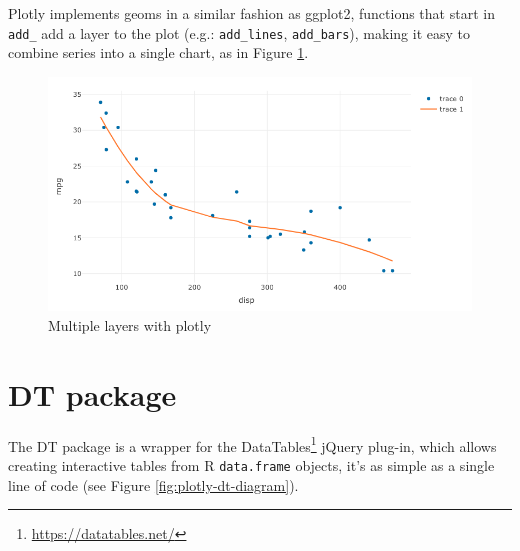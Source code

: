 \documentclass[10pt,]{krantz}
\makeatletter
\newenvironment{Shaded}{\begin{snugshade}}{\end{snugshade}}
\newcommand{\DataTypeTok}[1]{\textcolor[rgb]{0.27,0.27,0.27}{#1}}
\newcommand{\KeywordTok}[1]{\textcolor[rgb]{0.27,0.27,0.27}{\textbf{#1}}}
\newcommand{\NormalTok}[1]{#1}
\newcommand{\OperatorTok}[1]{\textcolor[rgb]{0.43,0.43,0.43}{\textbf{#1}}}
\newcommand{\StringTok}[1]{\textcolor[rgb]{0.5,0.5,0.5}{#1}}
\renewcommand{\href}[2]{#2\footnote{\url{#1}}}
\newenvironment{kframe}{%
\medskip{}
\setlength{\fboxsep}{.8em}
 \def\at@end@of@kframe{}%
 \ifinner\ifhmode%
  \def\at@end@of@kframe{\end{minipage}}%
  \begin{minipage}{\columnwidth}%
 \fi\fi%
 \def\FrameCommand##1{\hskip\@totalleftmargin \hskip-\fboxsep
 \colorbox{shadecolor}{##1}\hskip-\fboxsep
     \hskip-\linewidth \hskip-\@totalleftmargin \hskip\columnwidth}%
 \MakeFramed {\advance\hsize-\width
   \@totalleftmargin\z@ \linewidth\hsize
   \@setminipage}}%
 {\par\unskip\endMakeFramed%
 \at@end@of@kframe}
\renewenvironment{Shaded}{\begin{kframe}}{\end{kframe}}
\makeatother
\begin{document}
Plotly implements geoms in a similar fashion as ggplot2, functions that start in \texttt{add\_} add a layer to the plot (e.g.: \texttt{add\_lines}, \texttt{add\_bars}), making it easy to combine series into a single chart, as in Figure \ref{fig:plotly-layers-diagram}.

\begin{Shaded}
\end{Shaded}

\begin{figure}[H]

{\centering \includegraphics[width=1\linewidth]{images/03-plotly-multiple} 

}

\caption{Multiple layers with plotly}\label{fig:plotly-layers-diagram}
\end{figure}

\hypertarget{widgets-intro-dt}{%
\section{DT package}\label{widgets-intro-dt}}

The DT package \citep{R-DT} is a wrapper for the \href{https://datatables.net/}{DataTables} jQuery plug-in, which allows creating interactive tables from R \texttt{data.frame} objects, it's as simple as a single line of code (see Figure \ref{fig:plotly-dt-diagram}).
\end{document}
